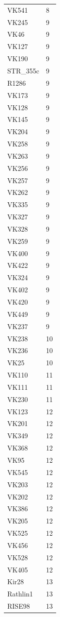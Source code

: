 \begin{longtable}[t]{ll}
VK541 & 8\\
VK245 & 9\\
VK46 & 9\\
VK127 & 9\\
VK190 & 9\\
STR\_355c & 9\\
R1286 & 9\\
VK173 & 9\\
VK128 & 9\\
VK145 & 9\\
VK204 & 9\\
VK258 & 9\\
VK263 & 9\\
VK256 & 9\\
VK257 & 9\\
VK262 & 9\\
VK335 & 9\\
VK327 & 9\\
VK328 & 9\\
VK259 & 9\\
VK400 & 9\\
VK422 & 9\\
VK324 & 9\\
VK402 & 9\\
VK420 & 9\\
VK449 & 9\\
VK237 & 9\\
VK238 & 10\\
VK236 & 10\\
VK25 & 10\\
VK110 & 11\\
VK111 & 11\\
VK230 & 11\\
VK123 & 12\\
VK201 & 12\\
VK349 & 12\\
VK368 & 12\\
VK95 & 12\\
VK545 & 12\\
VK203 & 12\\
VK202 & 12\\
VK386 & 12\\
VK205 & 12\\
VK525 & 12\\
VK456 & 12\\
VK528 & 12\\
VK405 & 12\\
Kir28 & 13\\
Rathlin1 & 13\\
RISE98 & 13\\

\end{longtable}
